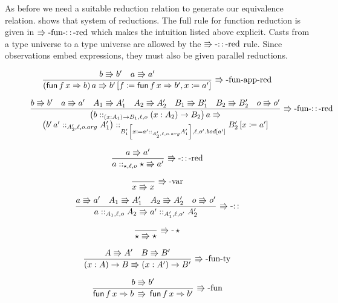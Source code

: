 As before we need a suitable reduction relation to generate our equivalence relation.
 shows that system of reductions.
The full rule for function reduction is given in $\operatorname{\Rrightarrow-fun-::-red}$ which makes the intuition listed above explicit.
Casts from a type universe to a type universe are allowed by the $\operatorname{\Rrightarrow-::-red}$ rule.
Since observations embed expressions, they must also be given parallel reductions.

\begin{figure}
\[
\frac{b\Rrightarrow b'\quad a\Rrightarrow a'}{\left(\mathsf{fun}\,f\,x\Rightarrow b\right)a\Rrightarrow b'\left[f\coloneqq\mathsf{fun}\,f\,x\Rightarrow b',x\coloneqq a'\right]}\,\operatorname{\Rrightarrow-fun-app-red}
\]

\[
\frac{b\Rrightarrow b'\quad a\Rrightarrow a'\quad A_{1}\Rrightarrow A_{1}'\quad A_{2}\Rrightarrow A_{2}'\quad B_{1}\Rrightarrow B_{1}'\quad B_{2}\Rrightarrow B_{2}'\quad o\Rrightarrow o'}{\begin{array}{c}
\left(b::_{\left(x:A_{1}\right)\rightarrow B_{1},\ell,o}\left(x:A_{2}\right)\rightarrow B_{2}\right)a\Rrightarrow\\
\left(b'\,a'::_{A_{2}',\ell,o.arg}A_{1}'\right)::_{B_{1}'\left[x\coloneqq a'::_{A_{2}',\ell,o.arg}A_{1}'\right],\ell,o'.bod[a']}B_{2}'\left[x\coloneqq a'\right]
\end{array}}\,\operatorname{\Rrightarrow-fun-::-red}
\]

\[
\frac{a\Rrightarrow a'}{a::_{\star,\ell,o}\star\Rrightarrow a'}\,\operatorname{\Rrightarrow-::-red}
\]

\[
\frac{\,}{x\Rrightarrow x}\,\operatorname{\Rrightarrow-var}
\]
\[
\frac{a\Rrightarrow a'\quad A_{1}\Rrightarrow A_{1}'\quad A_{2}\Rrightarrow A_{2}'\quad o\Rrightarrow o'}{a::_{A_{1},\ell,o}A_{2}\Rrightarrow a'::_{A_{1}',\ell,o'}A_{2}'}\,\operatorname{\Rrightarrow-::}
\]

\[
\frac{\,}{\star\Rrightarrow\star}\,\operatorname{\Rrightarrow-}\star
\]

\[
\frac{A\Rrightarrow A'\quad B\Rrightarrow B'}{\left(x:A\right)\rightarrow B\Rrightarrow\left(x:A'\right)\rightarrow B'}\,\operatorname{\Rrightarrow-fun-ty}
\]

\[
\frac{b\Rrightarrow b'}{\mathsf{fun}\,f\,x\Rightarrow b\,\Rrightarrow\,\mathsf{fun}\,f\,x\Rightarrow b'}\,\operatorname{\Rrightarrow-fun}
\]


\end{figure}
